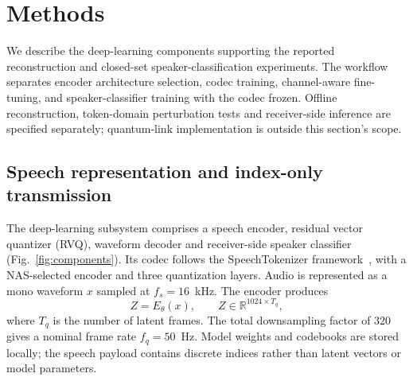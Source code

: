 \documentclass[final,5p,times,twocolumn]{elsarticle}
\begin{document}
\section{Methods}
\label{sec:methods}
We describe the deep-learning components supporting the reported reconstruction and closed-set speaker-classification experiments. The workflow separates encoder architecture selection, codec training, channel-aware fine-tuning, and speaker-classifier training with the codec frozen. Offline reconstruction, token-domain perturbation tests and receiver-side inference are specified separately; quantum-link implementation is outside this section's scope.

\subsection{Speech representation and index-only transmission}
The deep-learning subsystem comprises a speech encoder, residual vector quantizer (RVQ), waveform decoder and receiver-side speaker classifier (Fig.~\ref{fig:components}). Its codec follows the SpeechTokenizer framework~\cite{speechtokenizer}, with a NAS-selected encoder and three quantization layers. Audio is represented as a mono waveform $x$ sampled at $f_s=16$~kHz. The encoder produces
\begin{equation}
 Z=E_\theta(x),\qquad Z\in\mathbb{R}^{1024\times T_q},
\end{equation}
where $T_q$ is the number of latent frames. The total downsampling factor of 320 gives a nominal frame rate $f_q=50$~Hz. Model weights and codebooks are stored locally; the speech payload contains discrete indices rather than latent vectors or model parameters.
\end{document}
